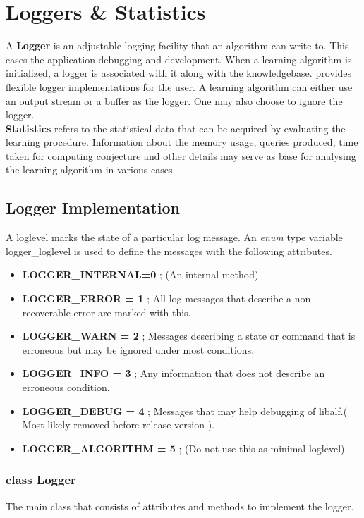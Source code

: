 \chapter{Loggers \& Statistics}

A \textbf{Logger} is an adjustable logging facility that an algorithm can write to. This eases the application debugging and development. When a learning algorithm is initialized, a logger is associated with it along with the knowledgebase. \libalf provides flexible logger implementations for the user. A learning algorithm can either use an output stream or a buffer as the logger. One may also choose to ignore the logger. \\
\textbf{Statistics} refers to the statistical data that can be acquired by evaluating the learning procedure. Information about the memory usage, queries produced, time taken for computing conjecture and other details may serve as base for analysing the learning algorithm in various cases. 

\section{Logger Implementation}
A loglevel marks the state of a particular log message. An \emph{enum} type variable logger\_loglevel is used to define the messages with the following attributes.
\begin{itemize}
 \item \textbf{LOGGER\_INTERNAL=0} ; (An internal method)
 \item \textbf{LOGGER\_ERROR = 1} ; All log messages that describe a non-recoverable error are marked with this.
 \item \textbf{LOGGER\_WARN = 2} ; Messages describing a state or command that is erroneous but may be ignored under most conditions.
 \item \textbf{LOGGER\_INFO = 3} ; Any information that does not describe an erroneous condition.
 \item \textbf{LOGGER\_DEBUG = 4} ; Messages that may help debugging of libalf.( Most likely removed before release version ).
 \item \textbf{LOGGER\_ALGORITHM = 5} ; (Do not use this as minimal loglevel)
\end{itemize}

\subsection{class Logger}
The main class that consists of attributes and methods to implement the logger. 

